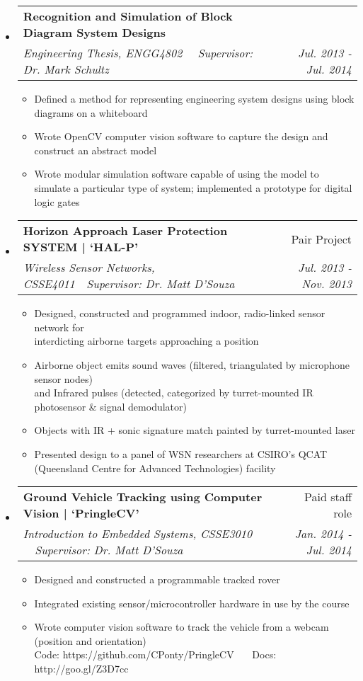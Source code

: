 \documentclass[letterpaper,11pt]{article}
\makeatletter
\newcommand{\resitem}[1]{\item #1 \vspace{-2pt}}
\newcommand{\resheading}[1]{{\large \fcolorbox{black}{mygrey}{\begin{minipage}{\textwidth}{\textbf{#1 \vphantom{p\^{E}}}}\end{minipage}}}}
\newcommand{\ressubheading}[4]{
\begin{tabular*}{7.0in}{l@{\extracolsep{\fill}}r}
		\textbf{#1} & #2 \\
		\textit{#3} & \textit{#4} \\
\end{tabular*}\vspace{-6pt}}
\makeatother
\begin{document}
\resheading{University Projects}
\begin{itemize}
\item
	\ressubheading{Recognition and Simulation of Block Diagram System Designs}{}{Engineering Thesis, ENGG4802 \ \textbar \ Supervisor: Dr. Mark Schultz}{Jul. 2013 - Jul. 2014}
	\begin{itemize}
		\resitem{Defined a method for representing engineering system designs using block diagrams on a whiteboard}
		\resitem{Wrote OpenCV computer vision software to capture the design and construct an abstract model}
		\resitem{Wrote modular simulation software capable of using the model to simulate a particular type of system; implemented a prototype for digital logic gates}
	\end{itemize}

\item
	\ressubheading{Horizon Approach Laser Protection SYSTEM | `HAL-P'}{Pair Project}{Wireless Sensor Networks, CSSE4011\ \textbar \ Supervisor: Dr. Matt D'Souza}{Jul. 2013 - Nov. 2013}
	\begin{itemize}
		\resitem{Designed, constructed and programmed indoor, radio-linked sensor network for \\ interdicting airborne targets approaching a position}
		\resitem{Airborne object emits sound waves (filtered, triangulated by microphone sensor nodes) \\ and Infrared pulses (detected, categorized by turret-mounted IR photosensor \& signal demodulator)}
		\resitem{Objects with IR + sonic signature match painted by turret-mounted laser}
		\resitem{Presented design to a panel of WSN researchers at CSIRO's QCAT (Queensland Centre for Advanced Technologies) facility}
	\end{itemize}

\item
	\ressubheading{Ground Vehicle Tracking using Computer Vision | `PringleCV'}{Paid staff role}{Introduction to Embedded Systems, CSSE3010 \ \textbar \ Supervisor: Dr. Matt D'Souza}{Jan. 2014 - Jul. 2014}
	\begin{itemize}
		\resitem{Designed and constructed a programmable tracked rover}
		\resitem{Integrated existing sensor/microcontroller hardware in use by the course}
		\resitem{Wrote computer vision software to track the vehicle from a webcam (position and orientation) }
		\\ \vspace{4 mm} Code: https://github.com/CPonty/PringleCV \ \textbar \ \ Docs: http://goo.gl/Z3D7cc
	\end{itemize}
\end{itemize}
\end{document}
